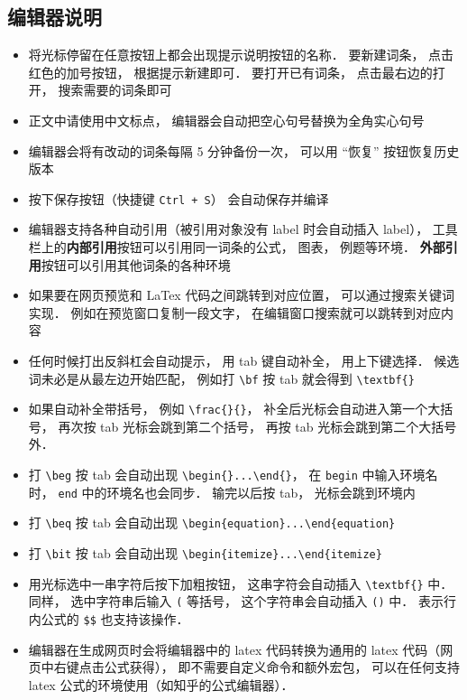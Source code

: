 \subsection{编辑器说明}
\begin{itemize}
\item 将光标停留在任意按钮上都会出现提示说明按钮的名称． 要新建词条， 点击红色的加号按钮， 根据提示新建即可． 要打开已有词条， 点击最右边的打开， 搜索需要的词条即可
\item 正文中请使用中文标点， 编辑器会自动把空心句号替换为全角实心句号
\item 编辑器会将有改动的词条每隔 5 分钟备份一次， 可以用 “恢复” 按钮恢复历史版本
\item 按下保存按钮（快捷键 \verb|Ctrl + S|） 会自动保存并编译
\item 编辑器支持各种自动引用（被引用对象没有 label 时会自动插入 label）， 工具栏上的\textbf{内部引用}按钮可以引用同一词条的公式， 图表， 例题等环境． \textbf{外部引用}按钮可以引用其他词条的各种环境
\item 如果要在网页预览和 LaTex 代码之间跳转到对应位置， 可以通过搜索关键词实现． 例如在预览窗口复制一段文字， 在编辑窗口搜索就可以跳转到对应内容
\item 任何时候打出反斜杠会自动提示， 用 tab 键自动补全， 用上下键选择． 候选词未必是从最左边开始匹配， 例如打 \verb|\bf| 按 tab 就会得到 \verb|\textbf{}|
\item 如果自动补全带括号， 例如 \verb|\frac{}{}|， 补全后光标会自动进入第一个大括号， 再次按 tab 光标会跳到第二个括号， 再按 tab 光标会跳到第二个大括号外．
\item 打 \verb|\beg| 按 tab 会自动出现 \verb|\begin{}...\end{}|， 在 \verb|begin| 中输入环境名时， \verb|end| 中的环境名也会同步． 输完以后按 tab， 光标会跳到环境内
\item 打 \verb|\beq| 按 tab 会自动出现 \verb|\begin{equation}...\end{equation}|
\item 打 \verb|\bit| 按 tab 会自动出现 \verb|\begin{itemize}...\end{itemize}|
\item 用光标选中一串字符后按下加粗按钮， 这串字符会自动插入 \verb|\textbf{}| 中． 同样， 选中字符串后输入 \verb|(| 等括号， 这个字符串会自动插入 \verb|()| 中． 表示行内公式的 \verb|$$| 也支持该操作．
\item 编辑器在生成网页时会将编辑器中的 latex 代码转换为通用的 latex 代码（网页中右键点击公式获得）， 即不需要自定义命令和额外宏包， 可以在任何支持 latex 公式的环境使用（如知乎的公式编辑器）．
\end{itemize}

